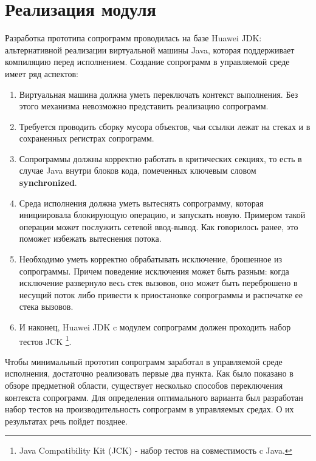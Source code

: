 \section{Реализация модуля}
	Разработка прототипа сопрограмм проводилась на базе Huawei JDK: альтернативной реализации виртуальной машины Java,
	которая поддерживает компиляцию перед исполнением. 
	Создание сопрограмм в управляемой среде имеет ряд аспектов: 
	\begin{enumerate}[align=left]
		\item Виртуальная машина должна уметь переключать контекст выполнения. Без этого механизма невозможно представить реализацию сопрограмм.
		\item Требуется проводить сборку мусора объектов, чьи ссылки лежат на стеках и в сохраненных регистрах сопрограмм. 
		\item Сопрограммы должны корректно работать в критических секциях, то есть в случае Java внутри блоков кода, помеченных ключевым словом \textbf{synchronized}.
		\item Среда исполнения должна уметь вытеснять сопрограмму, которая инициировала
		блокирующую операцию, и запускать новую. Примером такой операции может послужить
		сетевой ввод-вывод. Как говорилось ранее, это поможет избежать вытеснения потока.
		\item Необходимо уметь корректно обрабатывать исключение, брошенное из сопрограммы. Причем поведение 
		исключения может быть разным: когда исключение
		развернуло весь стек вызовов, оно может быть переброшено в
		несущий поток либо привести к приостановке сопрограммы и распечатке ее стека вызовов.
		\item И наконец, Huawei JDK c модулем сопрограмм должен проходить набор тестов JCK
		\footnote{Java Compatibility Kit (JCK) - набор тестов на совместимость c Java.}.
	\end{enumerate}
	Чтобы минимальный прототип сопрограмм заработал в управляемой среде исполнения, достаточно реализовать первые 
	два пункта. Как было показано в обзоре предметной области, существует несколько способов
	переключения контекста сопрограмм. Для определения оптимального варианта был разработан
	набор тестов на производительность сопрограмм в управляемых средах. О их результатах
	речь пойдет позднее. 
	
\clearpage